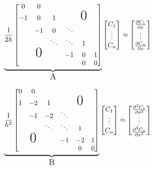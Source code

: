 \documentclass{article}
\begin{document}
{\begin{equation} \label{CentralDifference1}
        \underbrace{\frac{1}{2h}
        \begin{bmatrix}
        0 & 0 &  & & \\
        -1 & 0 & 1 & &\text{\huge{$0$}} & \\
         & -1 & 0 & \ddots &\\
         & & \ddots & \ddots & 1 \\
         & \text{\huge{$0$}} & & -1 & 0 & 1 \\
         & & & & 0 & 0
        \end{bmatrix}}_\text{\large{A}}
        \begin{bmatrix}
            C_1 \\ \vdots \\ C_n
        \end{bmatrix}
        \approx
        \begin{bmatrix}
            \frac{\partial C_1}{\partial x} \\ \vdots \\ \frac{\partial C_n}{\partial x}
        \end{bmatrix}
\end{equation}

\begin{equation}
        \underbrace{\frac{1}{h^2}
        \begin{bmatrix}
        0 & 0 &  & & \\
        1 & -2 & 1 & &\text{\huge{$0$}} & \\
         & -1 & -2 & \ddots &\\
         & & \ddots & \ddots & 1 \\
         & \text{\huge{$0$}} & & -1 & -2 & 1 \\
         & & & & 0 & 0
        \end{bmatrix}}_\text{\large{B}}
        \begin{bmatrix}
            C_1 \\ \vdots \\ C_n
        \end{bmatrix} \approx
        \begin{bmatrix}
            \frac{\partial^2 C_1}{\partial x^2} \\ \vdots \\ \frac{\partial^2 C_n}{\partial x^2}
        \end{bmatrix}
\end{equation}

}
\end{document}
